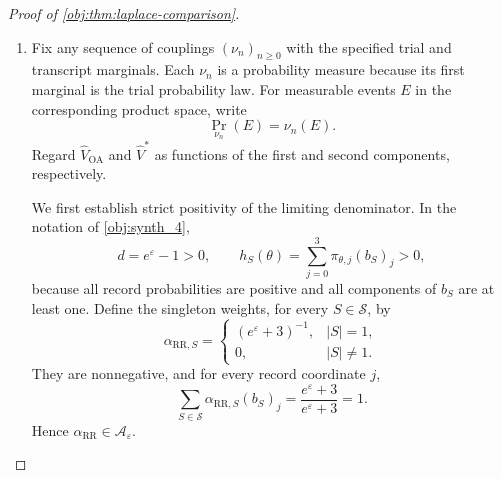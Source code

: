 \documentclass[11pt]{article}
\begin{document}
\begin{proof}[Proof of \cref{obj:thm:laplace-comparison}]
\begin{enumerate}
Take the privacy sequence
\[
\varepsilon_n=\varepsilon,\qquad n\in\mathbb N.
\]
It satisfies \cref{obj:ass:fixed-privacy}. The fixed measurable strong-saddle selector, the interior parameters, the chosen schedule, and \(0<\gamma<1\) meet the hypotheses of \cref{obj:thm:pilot-attainment}. Its variance-consistency conclusion supplies, under the transcript law of the selected procedure,
\[
\Pr_\theta\!\left(
|\widehat V^*-V^*(\theta,p,\varepsilon)|>\delta
\right)\longrightarrow0
\qquad(\delta>0).
\]

\item Fix any sequence of couplings \((\nu_n)_{n\ge0}\) with the specified trial and transcript marginals. Each \(\nu_n\) is a probability measure because its first marginal is the trial probability law. For measurable events \(E\) in the corresponding product space, write
\[
\Pr_{\nu_n}(E)=\nu_n(E).
\]
Regard \(\widehat V_{\mathrm{OA}}\) and \(\widehat V^*\) as functions of the first and second components, respectively.

We first establish strict positivity of the limiting denominator. In the notation of \cref{obj:synth_4},
\[
d=e^\varepsilon-1>0,
\qquad
h_S(\theta)
=
\sum_{j=0}^3\pi_{\theta,j}(b_S)_j>0,
\]
because all record probabilities are positive and all components of \(b_S\) are at least one. Define the singleton weights, for every \(S\in\mathcal S\), by
\[
\alpha_{\mathrm{RR},S}
=
\begin{cases}
(e^\varepsilon+3)^{-1},&|S|=1,\\
0,&|S|\ne1.
\end{cases}
\]
They are nonnegative, and for every record coordinate \(j\),
\[
\sum_{S\in\mathcal S}
\alpha_{\mathrm{RR},S}(b_S)_j
=
\frac{e^\varepsilon+3}{e^\varepsilon+3}=1.
\]
Hence \(\alpha_{\mathrm{RR}}\in\mathcal A_\varepsilon\).


\end{enumerate}
\end{proof}
\end{document}
